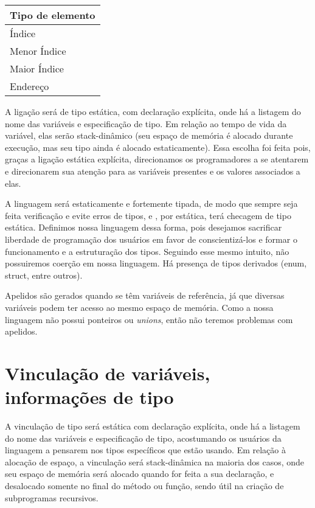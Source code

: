 \begin{tabular}{| l |}
    \hline
    Tipo de elemento \\
    \hline
    Índice \\
    \hline
    Menor Índice \\
    \hline
    Maior Índice \\
    \hline
    Endereço \\
    \hline
\end{tabular}

A ligação será de tipo estática, com declaração explícita, onde há a listagem
do nome das variáveis e especificação de tipo. Em relação ao tempo de vida da
variável, elas serão stack-dinâmico (seu espaço de memória é alocado durante
execução, mas seu tipo ainda é alocado estaticamente). Essa escolha foi feita
pois, graças a ligação estática explícita, direcionamos os programadores a se
atentarem e direcionarem sua atenção para as variáveis presentes e os valores
associados a elas.

A linguagem será estaticamente e fortemente tipada, de modo que sempre seja
feita verificação e evite erros de tipos, e , por estática, terá checagem de
tipo estática. Definimos nossa linguagem dessa forma, pois desejamos sacrificar
liberdade de programação dos usuários em favor de conscientizá-los e formar o
funcionamento e a estruturação dos tipos. Seguindo esse mesmo intuito, não
possuiremos coerção em nossa linguagem. Há presença de tipos derivados (enum,
struct, entre outros).

Apelidos são gerados quando se têm variáveis de referência, já que diversas
variáveis podem ter acesso ao mesmo espaço de memória. Como a nossa linguagem
não possui ponteiros ou \emph{unions}, então não teremos problemas com apelidos.

\section{Vinculação de variáveis, informações de tipo}

A vinculação de tipo será estática com declaração explícita, onde há a listagem
do nome das variáveis e especificação de tipo, acostumando os usuários da
linguagem a pensarem nos tipos específicos que estão usando. Em relação à
alocação de espaço, a vinculação será stack-dinâmica na maioria dos casos, onde
seu espaço de memória será alocado quando for feita a sua declaração, e
desalocado somente no final do método ou função, sendo útil na criação de
subprogramas recursivos.


